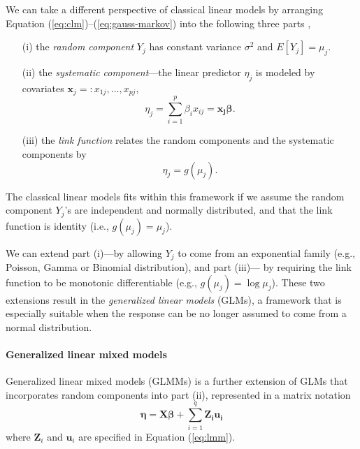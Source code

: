We can take a different perspective of classical linear models by arranging Equation
(\ref{eq:clm})--(\ref{eq:gauss-markov}) into the following three parts \citep[Chapter
2]{mccullagh1989generalized}, 
\begin{enumerate}
	\item[(i)] the \textit{random component} $Y_j$ has constant variance $\sigma^2$ and
	$E[ Y_j]= \mu_j$.
	\item[(ii)] the \textit{systematic component}---the linear predictor $\eta_j$ is modeled by
	covariates $\bm x_j =: x_{1j},\ldots, x_{pj}$, 
	\begin{equation}\label{eq:part2}
		\eta_j = \sum_{i=1}^p\beta_i x_{ij}=\bm {x_j\beta}.
	\end{equation}
	\item[(iii)] the \textit{link function} relates the random components and the systematic
	components by 
	\begin{equation}\label{eq:part3}
		\eta_j = g(\mu_j).
	\end{equation}
\end{enumerate}
The classical linear models fits within this framework if we assume the random component $Y_j$'s
are independent and normally distributed, and that the link function is identity (i.e., $g(\mu_j)=
\mu_j$).

We can extend part (i)---by allowing $Y_j$ to come from an exponential family (e.g., Poisson,
Gamma or Binomial distribution), and part (iii)--- by requiring the link function to be monotonic
differentiable (e.g., $g(\mu_j)= \log \mu_j$). These two extensions result in the
\textit{generalized linear models} (GLMs), a framework that is especially suitable when the response
can be no longer assumed to come from a normal distribution.


\paragraph{Generalized linear mixed models}\label{para:glmm}
Generalized linear mixed models (GLMMs) is a further extension of GLMs that incorporates random
components into part (ii), represented in a matrix notation
\begin{equation}\label{eq:q5}
	\bm \eta = \bm {X\beta} + \sum_{i=1}^q\bm {Z_iu_i}
\end{equation}
where  $\bm Z_i$ and $\bm u_i$ are specified in Equation (\ref{eq:lmm}). 

